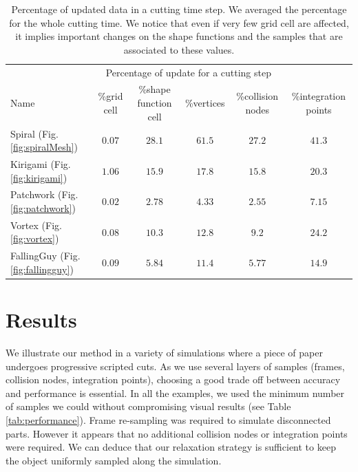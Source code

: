 \begin{table}[!ht]
\centering
\begin{tabular}{l|ccccc}
& \multicolumn{4}{c}{Percentage of update for a cutting step} \\
Name & \%grid cell &\%shape function cell & \%vertices & \%collision nodes & \%integration points \\ \hline
Spiral (Fig. \ref{fig:spiralMesh}) & $0.07$ & $28.1$ & $61.5$ & $27.2$ & $41.3$\\
Kirigami (Fig. \ref{fig:kirigami}) & $1.06$ & $15.9$ & $17.8$ & $15.8$ & $20.3$\\
Patchwork (Fig. \ref{fig:patchwork}) & $0.02$ & $2.78$ & $4.33$ & $2.55$ & $7.15$\\
Vortex (Fig. \ref{fig:vortex}) & $0.08$ & $10.3$ & $12.8$ & $9.2$ & $24.2$\\
FallingGuy (Fig. \ref{fig:fallingguy}) & $0.09$ & $5.84$ & $11.4$ & $5.77$ & $14.9$\\
\end{tabular}
\caption[Frame-based cutting: Incremental update timings]{\label{tab:incrementalUpdate} Percentage of updated data in a cutting time step. We averaged the percentage for the whole cutting time. We notice that even if very few grid cell are affected, it implies important changes on the shape functions and the samples that are associated to these values.}
\end{table}

\section{Results} \label{sec:results}

We illustrate our method in a variety of simulations where a piece of paper undergoes progressive scripted cuts. As we use several layers of samples (frames, collision nodes, integration points), choosing a good trade off between accuracy and performance is essential. In all the examples, we used the minimum number of samples we could without compromising visual results (see Table \ref{tab:performance}). Frame re-sampling was required to simulate disconnected parts. However it appears that no additional collision nodes or integration points were required. We can deduce that our relaxation strategy is sufficient to keep the object uniformly sampled along the simulation.

